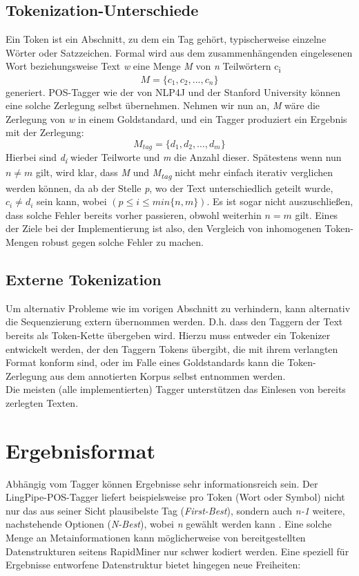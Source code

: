 \subsection{Tokenization-Unterschiede}
\label{sec:concept:sequence:tok}

Ein Token ist ein Abschnitt, zu dem ein Tag gehört, typischerweise einzelne Wörter oder Satzzeichen. Formal wird aus dem zusammenhängenden eingelesenen Wort beziehungsweise Text \textit{w} eine Menge \textit{M} von \textit{n} Teilwörtern c\textsubscript{i} 
 \[  M = \{ c_1 , c_2 , ... , c_n \} \] 
 generiert. POS-Tagger wie der von NLP4J \cite{choi} und der Stanford University \cite{Paper:StanfordTagger} können eine solche Zerlegung selbst übernehmen. Nehmen wir nun an, \textit{M} wäre die Zerlegung von \textit{w} in einem Goldstandard, und ein Tagger produziert ein Ergebnis mit der Zerlegung:
 \[  M_{tag} = \{ d_1 , d_2 , ... , d_m \} \]
Hierbei sind \textit{d\textsubscript{i}} wieder Teilworte und \textit{m} die Anzahl dieser. Spätestens wenn nun $n \neq m$ gilt, wird klar, dass \textit{M} und \textit{M\textsubscript{tag}} nicht mehr einfach iterativ verglichen werden können, da ab der Stelle \textit{p}, wo der Text unterschiedlich geteilt wurde, $ c_i \neq d_i $ sein kann, wobei $ (p \leq i \leq min\{ n, m \}) $. Es ist sogar nicht auszuschließen, dass solche Fehler bereits vorher passieren, obwohl weiterhin $n = m$ gilt.
\newline
Eines der Ziele bei der Implementierung ist also, den Vergleich von inhomogenen Token-Mengen robust gegen solche Fehler zu machen. 

\subsection{Externe Tokenization}
Um alternativ Probleme wie im vorigen Abschnitt zu verhindern, kann alternativ die Sequenzierung extern übernommen werden. D.h. dass den Taggern der Text bereits als Token-Kette übergeben wird. Hierzu muss entweder ein Tokenizer entwickelt werden, der den Taggern Tokens übergibt, die mit ihrem verlangten Format konform sind, oder im Falle eines Goldstandards kann die Token-Zerlegung aus dem annotierten Korpus selbst entnommen werden.
\\ Die meisten (alle implementierten) Tagger unterstützen das Einlesen von bereits zerlegten Texten.



\section{Ergebnisformat}
\label{sec:concept:format}
Abhängig vom Tagger können Ergebnisse sehr informationsreich sein. Der LingPipe-POS-Tagger liefert beispielsweise pro Token (Wort oder Symbol) nicht nur das aus seiner Sicht plausibelste Tag (\textit{First-Best}), sondern auch \textit{n-1} weitere, nachstehende Optionen (\textit{N-Best}), wobei \textit{n} gewählt werden kann \cite{Lingpipedoc}. Eine solche Menge an Metainformationen kann möglicherweise von bereitgestellten Datenstrukturen seitens RapidMiner nur schwer kodiert werden. Eine speziell für Ergebnisse entworfene Datenstruktur bietet hingegen neue Freiheiten:


